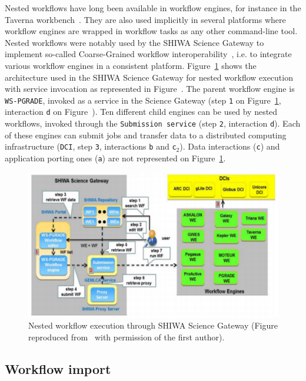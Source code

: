 \documentclass[preprint,3p,twocolumn]{elsarticle}
\begin{document}
Nested workflows have long been available in workflow engines, for
instance in the Taverna workbench~\cite{oinn2004taverna}. They are
also used implicitly in several platforms where workflow engines are
wrapped in workflow tasks as any other command-line tool. Nested
workflows were notably used by the SHIWA Science Gateway to implement
so-called Coarse-Grained workflow
interoperability~\cite{terstyanszky2014enabling}, i.e. to integrate
various workflow engines in a consistent
platform. Figure~\ref{fig:shiwa-architecture} shows the architecture
used in the SHIWA Science Gateway for nested workflow execution with
service invocation as represented in Figure~. The
parent workflow engine is \texttt{WS-PGRADE}, invoked as a service in
the Science Gateway (step \texttt{1} on
Figure~\ref{fig:shiwa-architecture}, interaction \texttt{d} on
Figure~). Ten different child engines can be used by
nested workflows, invoked through the \texttt{Submission service}
(step \texttt{2}, interaction \texttt{d}). Each of these engines can
submit jobs and transfer data to a distributed computing
infrastructure (\texttt{DCI}, step \texttt{3}, interactions \texttt{b}
and \texttt{c$_2$}). Data interactions (\texttt{c}) and application
porting ones (\texttt{a}) are not represented on
Figure~\ref{fig:shiwa-architecture}.

\begin{figure}
\centering
\includegraphics[width=1.5\columnwidth]{figures/shiwa-science-gateway.pdf}
\caption{Nested workflow execution through SHIWA Science Gateway
  (Figure reproduced from~\cite{terstyanszky2014enabling} with
  permission of the first author).}
\label{fig:shiwa-architecture}
\end{figure}

\subsection{Workflow import}
\end{document}
